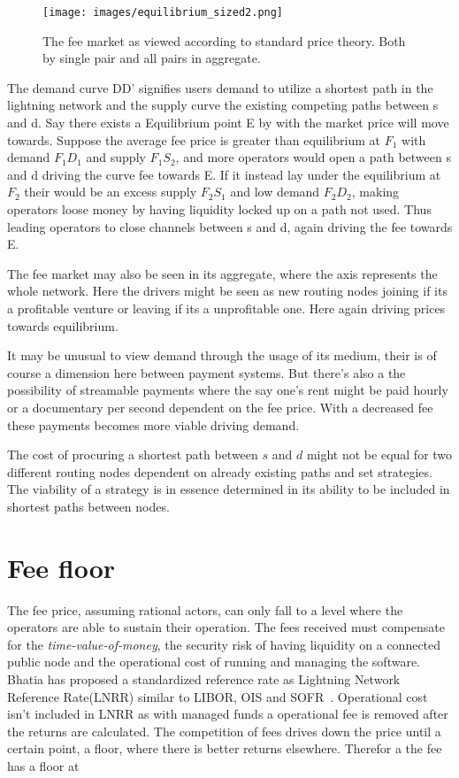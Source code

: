 \begin{figure}[!htb]
	\hspace*{-0.3cm}
	\centering
	\texttt{[image: images/equilibrium\_sized2.png]}
	\caption{ The fee market as viewed according to standard price theory. Both by single pair and all pairs in aggregate. 
		}
		\label{fig:equilibrium}
		\hspace*{2mm} 	
\end{figure}

The demand curve DD' signifies users demand to utilize a shortest path in the lightning network and the supply curve the existing competing paths between s and d. Say there exists a Equilibrium point E by with the market price will move towards. Suppose the average fee price is greater than equilibrium at $F_{1}$ with demand $F_{1}D_{1}$ and supply $F_{1}S_{2}$, and more operators would open a path between s and d driving the curve fee towards E. If it instead lay under the equilibrium at $F_2$ their would be an excess supply $F_{2}S_{1}$ and low demand $F_{2}D_{2}$, making operators loose money by having liquidity locked up on a path not used. Thus leading operators to close channels between s and d, again driving the fee towards E.

The fee market may also be seen in its aggregate, where the axis represents the whole network. Here the drivers might be seen as new routing nodes joining if its a profitable venture or leaving if its a unprofitable one. Here again driving prices towards equilibrium. 

It may be unusual to view demand through the usage of its medium, their is of course a dimension here between payment systems. But there's also a the possibility of streamable payments where the say one's rent might be paid hourly or a documentary per second dependent on the fee price. With a decreased fee these payments becomes more viable driving demand.

The cost of procuring a shortest path between $s$ and $d$ might not be equal for two different routing nodes dependent on already existing paths and set strategies. The viability of a strategy is in essence determined in its ability to be included in shortest paths between nodes.

\section{Fee floor}

The fee price, assuming rational actors, can only fall to a level where the operators are able to sustain their operation. The fees received must compensate for the \textit{time-value-of-money}, the security risk of having liquidity on a connected public node and the operational cost of running and managing the software. Bhatia has proposed a standardized reference rate as Lightning Network Reference Rate(LNRR) similar to LIBOR, OIS and SOFR~\cite{bhatia:time:value}. Operational cost isn't included in LNRR as with managed funds a  operational fee is removed after the returns are calculated. The competition of fees drives down the price until a certain point, a floor, where there is better returns elsewhere. Therefor a the fee has a floor at

